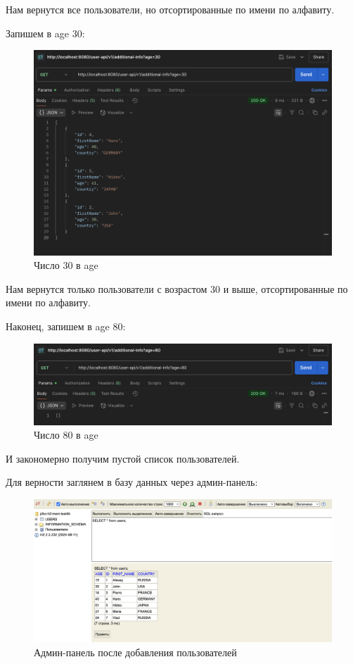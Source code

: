\documentclass[a4paper, 14pt]{article}
\begin{document}
Нам вернутся все пользователи, но отсортированные по имени по алфавиту.

Запишем в age 30:

\begin{figure}[H]
	\centering
	\includegraphics[width=15cm]{resources/12.png}
	\caption{Число 30 в age}
\end{figure}

Нам вернутся только пользователи с возрастом 30 и выше, отсортированные по имени по алфавиту.

Наконец, запишем в age 80:

\begin{figure}[H]
	\centering
	\includegraphics[width=15cm]{resources/13.png}
	\caption{Число 80 в age}
\end{figure}

И закономерно получим пустой список пользователей.

Для верности заглянем в базу данных через админ-панель:

\begin{figure}[H]
	\centering
	\includegraphics[width=15cm]{resources/14.png}
	\caption{Админ-панель после добавления пользователей}
\end{figure}
\end{document}

